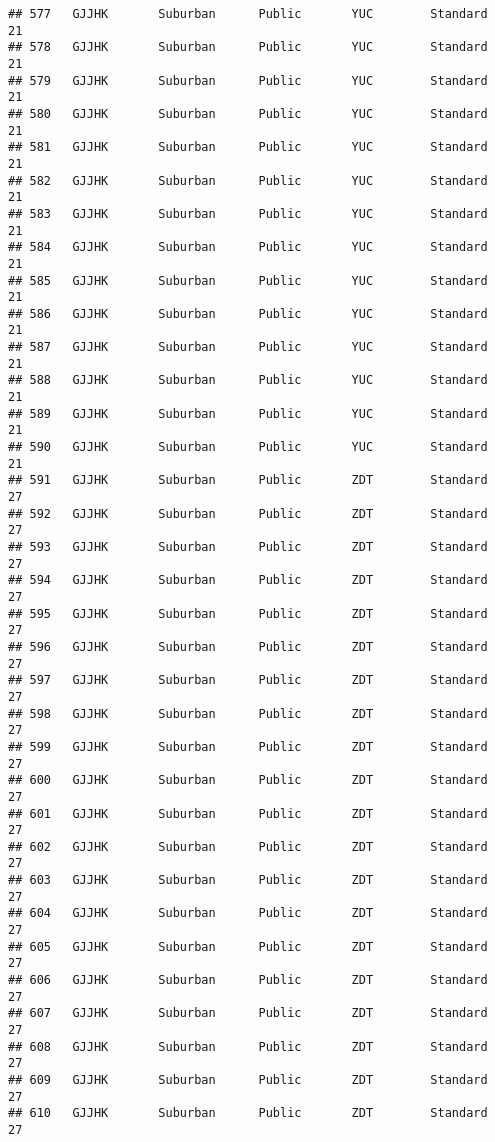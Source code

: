 \documentclass[
]{article}
\begin{document}
\begin{verbatim}
## 577   GJJHK       Suburban      Public       YUC        Standard        21
## 578   GJJHK       Suburban      Public       YUC        Standard        21
## 579   GJJHK       Suburban      Public       YUC        Standard        21
## 580   GJJHK       Suburban      Public       YUC        Standard        21
## 581   GJJHK       Suburban      Public       YUC        Standard        21
## 582   GJJHK       Suburban      Public       YUC        Standard        21
## 583   GJJHK       Suburban      Public       YUC        Standard        21
## 584   GJJHK       Suburban      Public       YUC        Standard        21
## 585   GJJHK       Suburban      Public       YUC        Standard        21
## 586   GJJHK       Suburban      Public       YUC        Standard        21
## 587   GJJHK       Suburban      Public       YUC        Standard        21
## 588   GJJHK       Suburban      Public       YUC        Standard        21
## 589   GJJHK       Suburban      Public       YUC        Standard        21
## 590   GJJHK       Suburban      Public       YUC        Standard        21
## 591   GJJHK       Suburban      Public       ZDT        Standard        27
## 592   GJJHK       Suburban      Public       ZDT        Standard        27
## 593   GJJHK       Suburban      Public       ZDT        Standard        27
## 594   GJJHK       Suburban      Public       ZDT        Standard        27
## 595   GJJHK       Suburban      Public       ZDT        Standard        27
## 596   GJJHK       Suburban      Public       ZDT        Standard        27
## 597   GJJHK       Suburban      Public       ZDT        Standard        27
## 598   GJJHK       Suburban      Public       ZDT        Standard        27
## 599   GJJHK       Suburban      Public       ZDT        Standard        27
## 600   GJJHK       Suburban      Public       ZDT        Standard        27
## 601   GJJHK       Suburban      Public       ZDT        Standard        27
## 602   GJJHK       Suburban      Public       ZDT        Standard        27
## 603   GJJHK       Suburban      Public       ZDT        Standard        27
## 604   GJJHK       Suburban      Public       ZDT        Standard        27
## 605   GJJHK       Suburban      Public       ZDT        Standard        27
## 606   GJJHK       Suburban      Public       ZDT        Standard        27
## 607   GJJHK       Suburban      Public       ZDT        Standard        27
## 608   GJJHK       Suburban      Public       ZDT        Standard        27
## 609   GJJHK       Suburban      Public       ZDT        Standard        27
## 610   GJJHK       Suburban      Public       ZDT        Standard        27

\end{verbatim}
\end{document}
